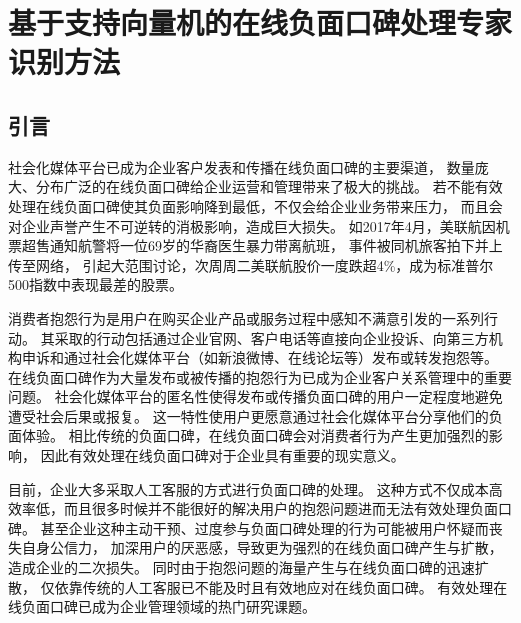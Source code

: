 \chapter{基于支持向量机的在线负面口碑处理专家识别方法}\label{chapter:2}
\section{引言}\label{sec:2.1}

社会化媒体平台已成为企业客户发表和传播在线负面口碑的主要渠道，
数量庞大、分布广泛的在线负面口碑给企业运营和管理带来了极大的挑战。
若不能有效处理在线负面口碑使其负面影响降到最低，不仅会给企业业务带来压力，
而且会对企业声誉产生不可逆转的消极影响，造成巨大损失。
如2017年4月，美联航因机票超售通知航警将一位69岁的华裔医生暴力带离航班，
事件被同机旅客拍下并上传至网络，
引起大范围讨论，次周周二美联航股价一度跌超4\%，成为标准普尔500指数中表现最差的股票\cite{victor2017airlines}。

消费者抱怨行为是用户在购买企业产品或服务过程中感知不满意引发的一系列行动。
其采取的行动包括通过企业官网、客户电话等直接向企业投诉、向第三方机构申诉和通过社会化媒体平台（如新浪微博、在线论坛等）发布或转发抱怨等。
在线负面口碑作为大量发布或被传播的抱怨行为已成为企业客户关系管理中的重要问题\cite{fornell1987defensive}。
社会化媒体平台的匿名性使得发布或传播负面口碑的用户一定程度地避免遭受社会后果或报复\cite{woong2011selective}。
这一特性使用户更愿意通过社会化媒体平台分享他们的负面体验。
相比传统的负面口碑，在线负面口碑会对消费者行为产生更加强烈的影响，
因此有效处理在线负面口碑对于企业具有重要的现实意义。

目前，企业大多采取人工客服的方式进行负面口碑的处理。
这种方式不仅成本高效率低，而且很多时候并不能很好的解决用户的抱怨问题进而无法有效处理负面口碑。
甚至企业这种主动干预、过度参与负面口碑处理的行为可能被用户怀疑而丧失自身公信力\cite{dellarocas2006strategic}，
加深用户的厌恶感，导致更为强烈的在线负面口碑产生与扩散，造成企业的二次损失\cite{van2012online}。
同时由于抱怨问题的海量产生与在线负面口碑的迅速扩散，
仅依靠传统的人工客服已不能及时且有效地应对在线负面口碑。
有效处理在线负面口碑已成为企业管理领域的热门研究课题。

